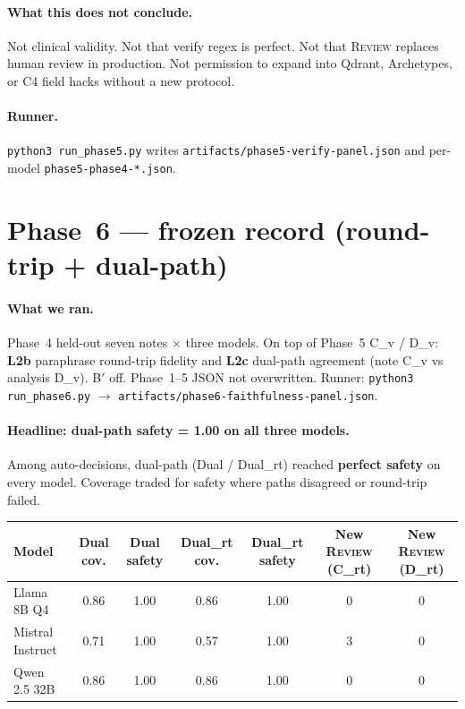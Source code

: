 \documentclass[11pt,a4paper]{article}
\newcommand{\rev}{\textsc{Review}}
\begin{document}
\paragraph{What this does not conclude.}
Not clinical validity. Not that verify regex is perfect. Not that \rev{} replaces human review in production.
Not permission to expand into Qdrant, Archetypes, or C4 field hacks without a new protocol.

\paragraph{Runner.}
\texttt{python3 run\_phase5.py} writes \texttt{artifacts/phase5-verify-panel.json} and per-model \texttt{phase5-phase4-*.json}.

\section{Phase~6 --- frozen record (round-trip + dual-path)}

\paragraph{What we ran.}
Phase~4 held-out seven notes $\times$ three models.
On top of Phase~5 C\_v / D\_v: \textbf{L2b} paraphrase round-trip fidelity and \textbf{L2c} dual-path agreement (note C\_v vs analysis D\_v).
B$'$ off. Phase~1--5 JSON not overwritten.
Runner: \texttt{python3 run\_phase6.py} $\rightarrow$ \texttt{artifacts/phase6-faithfulness-panel.json}.

\paragraph{Headline: dual-path safety = 1.00 on all three models.}
Among auto-decisions, dual-path (Dual / Dual\_rt) reached \textbf{perfect safety} on every model.
Coverage traded for safety where paths disagreed or round-trip failed.

\begin{center}
\small
\begin{tabular}{lcccccc}
\toprule
Model & Dual cov. & Dual safety & Dual\_rt cov. & Dual\_rt safety & New \rev{} (C\_rt) & New \rev{} (D\_rt) \\
\midrule
Llama 8B Q4 & 0.86 & 1.00 & 0.86 & 1.00 & 0 & 0 \\
Mistral Instruct & 0.71 & 1.00 & 0.57 & 1.00 & 3 & 0 \\
Qwen 2.5 32B & 0.86 & 1.00 & 0.86 & 1.00 & 0 & 0 \\
\bottomrule
\end{tabular}
\end{center}
\end{document}
